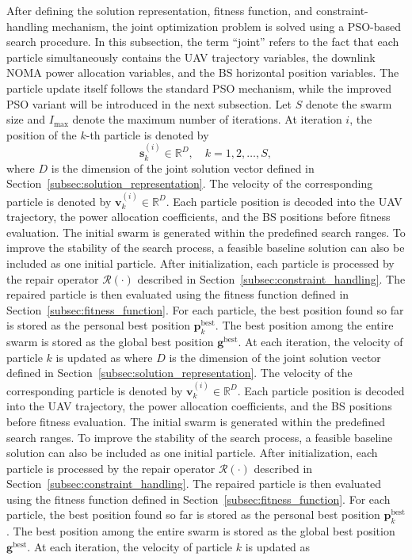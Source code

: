 \documentclass[conference]{IEEEtran}
\begin{document}
After defining the solution representation, fitness function, and constraint-handling mechanism, the joint optimization problem is solved using a PSO-based search procedure. In this subsection, the term ``joint'' refers to the fact that each particle simultaneously contains the UAV trajectory variables, the downlink NOMA power allocation variables, and the BS horizontal position variables. The particle update itself follows the standard PSO mechanism, while the improved PSO variant will be introduced in the next subsection. Let $S$ denote the swarm size and $I_{\max}$ denote the maximum number of iterations. At iteration $i$, the position of the $k$-th particle is denoted by 
\begin{equation} 
\mathbf{s}_k^{(i)} \in \mathbb{R}^{D}, 
\quad k = 1,2,\ldots,S, 
\end{equation} 
where $D$ is the dimension of the joint solution vector defined in Section~\ref{subsec:solution_representation}. The velocity of the corresponding particle is denoted by $\mathbf{v}_k^{(i)} \in \mathbb{R}^{D}$. Each particle position is decoded into the UAV trajectory, the power allocation coefficients, and the BS positions before fitness evaluation. The initial swarm is generated within the predefined search ranges. To improve the stability of the search process, a feasible baseline solution can also be included as one initial particle. After initialization, each particle is processed by the repair operator $\mathcal{R}(\cdot)$ described in Section~\ref{subsec:constraint_handling}. The repaired particle is then evaluated using the fitness function defined in Section~\ref{subsec:fitness_function}. For each particle, the best position found so far is stored as the personal best position $\mathbf{p}_k^{\mathrm{best}}$. The best position among the entire swarm is stored as the global best position $\mathbf{g}^{\mathrm{best}}$. At each iteration, the velocity of particle $k$ is updated as 
where $D$ is the dimension of the joint solution vector defined in Section~\ref{subsec:solution_representation}. The velocity of the corresponding particle is denoted by $\mathbf{v}_k^{(i)} \in \mathbb{R}^{D}$. Each particle position is decoded into the UAV trajectory, the power allocation coefficients, and the BS positions before fitness evaluation. The initial swarm is generated within the predefined search ranges. To improve the stability of the search process, a feasible baseline solution can also be included as one initial particle. After initialization, each particle is processed by the repair operator $\mathcal{R}(\cdot)$ described in Section~\ref{subsec:constraint_handling}. The repaired particle is then evaluated using the fitness function defined in Section~\ref{subsec:fitness_function}. For each particle, the best position found so far is stored as the personal best position $\mathbf{p}_k^{\mathrm{best}}$. The best position among the entire swarm is stored as the global best position $\mathbf{g}^{\mathrm{best}}$. At each iteration, the velocity of particle $k$ is updated as
\end{document}
